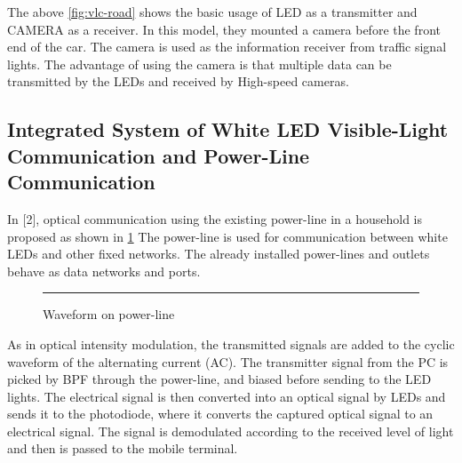 The above \ref{fig:vlc-road} shows the basic usage of LED as a transmitter and CAMERA as a
receiver. In this model, they mounted a camera before the front end of the car. The
camera is used as the information receiver from traffic signal lights. The advantage of
using the camera is that multiple data can be transmitted by the LEDs and received by
High-speed cameras. 


\subsection{Integrated System of White LED Visible-Light Communication and Power-Line Communication}

In [2], optical communication using the existing power-line in a household is proposed as
shown in \ref{fig:vlc-powerline}
The power-line is used for communication between white LEDs and other fixed
networks. The already installed power-lines and outlets behave as data networks and
ports.

\begin{figure}[htbp]
  \centering
    \rule{35em}{0.5pt}
  \caption[Waveform on power-linel]{Waveform on power-line}
  \label{fig:vlc-powerline}
\end{figure}

As in optical intensity modulation, the transmitted signals are added to the cyclic
waveform of the alternating current (AC). The transmitter signal from the PC is picked
by BPF through the power-line, and biased before sending to the LED lights. The
electrical signal is then converted into an optical signal by LEDs and sends it to the
photodiode, where it converts the captured optical signal to an electrical signal. The
signal is demodulated according to the received level of light and then is passed to the
mobile terminal.

